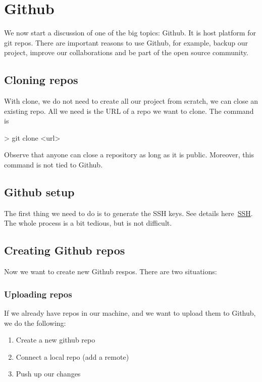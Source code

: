 \section{Github}

We now start a discussion of one of the big topics: Github. It is host platform for git repos. There
are important reasons to use Github, for example, backup our project, improve our collaborations
and be part of the open source community.

\subsection{Cloning repos}

With clone, we do not need to create all our project from scratch, we can close an existing repo. 
All we need is the URL of a repo we want to clone. The command is 
\begin{listing}{1}
> git clone <url>
\end{listing}
Observe that anyone can close a repository as long as it is public. Moreover, this command is not 
tied to Github.

\subsection{Github setup}

The first thing we need to do is to generate the SSH keys. See details 
here~\href{https://docs.github.com/en/authentication/connecting-to-github-with-ssh}{SSH}. The 
whole process is a bit tedious, but is not difficult. 

\subsection{Creating Github repos}

Now we want to create new Github respos. There are two situations:

\subsubsection{Uploading repos} If we already have repos in our machine, and we want to upload them
to Github, we do the following:
\begin{enumerate}
    \item Create a new github repo 
    \item Connect a local repo (add a remote)
    \item Push up our changes
\end{enumerate}

